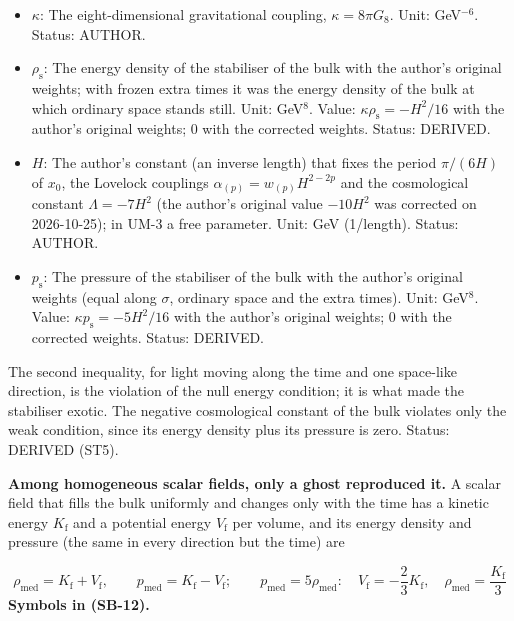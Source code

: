 \documentclass[
  10pt,
]{article}
\providecommand{\tightlist}{%
  \setlength{\itemsep}{0pt}\setlength{\parskip}{0pt}}
\begin{document}
\begin{itemize}
\tightlist
\item
  \(\kappa\): The eight-dimensional gravitational coupling,
  \(\kappa = 8\pi G_8\). Unit: GeV\(^{-6}\). Status: AUTHOR.
\item
  \(\rho_{\mathrm{s}}\): The energy density of the stabiliser of the
  bulk with the author's original weights; with frozen extra times it
  was the energy density of the bulk at which ordinary space stands
  still. Unit: GeV\(^8\). Value: \(\kappa\rho_{\mathrm{s}} = -H^2/16\)
  with the author's original weights; 0 with the corrected weights.
  Status: DERIVED.
\item
  \(H\): The author's constant (an inverse length) that fixes the period
  \(\pi/(6H)\) of \(x_0\), the Lovelock couplings
  \(\alpha_{(p)} = w_{(p)}H^{2-2p}\) and the cosmological constant
  \(\Lambda = -7H^2\) (the author's original value \(-10H^2\) was
  corrected on 2026-10-25); in UM-3 a free parameter. Unit: GeV
  (1/length). Status: AUTHOR.
\item
  \(p_{\mathrm{s}}\): The pressure of the stabiliser of the bulk with
  the author's original weights (equal along \(\sigma\), ordinary space
  and the extra times). Unit: GeV\(^8\). Value:
  \(\kappa p_{\mathrm{s}} = -5H^2/16\) with the author's original
  weights; 0 with the corrected weights. Status: DERIVED.
\end{itemize}

The second inequality, for light moving along the time and one
space-like direction, is the violation of the null energy condition; it
is what made the stabiliser exotic. The negative cosmological constant
of the bulk violates only the weak condition, since its energy density
plus its pressure is zero. Status: DERIVED (ST5).

\textbf{Among homogeneous scalar fields, only a ghost reproduced it.} A
scalar field that fills the bulk uniformly and changes only with the
time has a kinetic energy \(K_{\mathrm{f}}\) and a potential energy
\(V_{\mathrm{f}}\) per volume, and its energy density and pressure (the
same in every direction but the time) are

\[
\rho_{\mathrm{med}} = K_{\mathrm{f}} + V_{\mathrm{f}},\qquad p_{\mathrm{med}} = K_{\mathrm{f}} - V_{\mathrm{f}};\qquad
p_{\mathrm{med}} = 5\rho_{\mathrm{med}}:\quad V_{\mathrm{f}} = -\frac{2}{3}K_{\mathrm{f}},\quad \rho_{\mathrm{med}} = \frac{K_{\mathrm{f}}}{3} \tag{SB-12}
\] \textbf{Symbols in (SB-12).}
\end{document}
